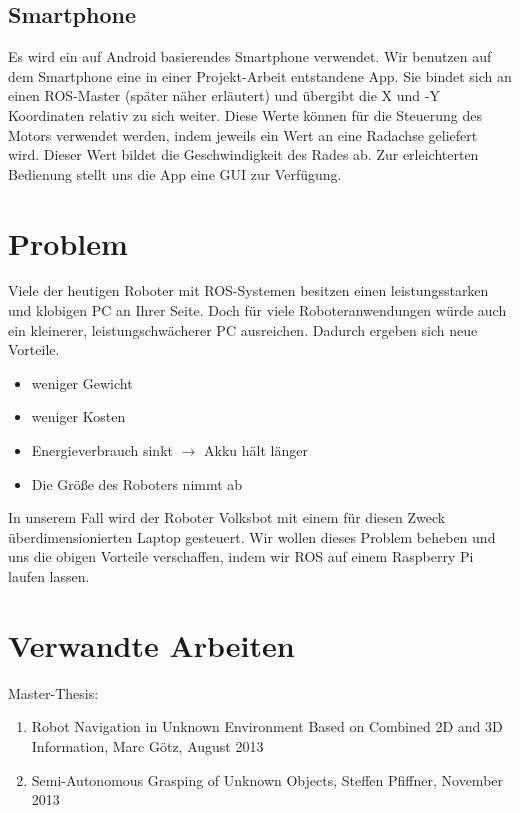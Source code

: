 \documentclass[12pt]{article}
\begin{document}
\subsection{Smartphone}

Es wird ein auf Android basierendes Smartphone verwendet.
Wir benutzen auf dem Smartphone eine in einer Projekt-Arbeit entstandene App.
Sie bindet sich an einen ROS-Master (später näher erläutert) und übergibt die X und -Y Koordinaten relativ zu sich weiter.
Diese Werte können für die Steuerung des Motors verwendet werden, indem jeweils ein Wert an eine Radachse geliefert wird. Dieser Wert bildet die Geschwindigkeit des Rades ab.
Zur erleichterten Bedienung stellt uns die App eine GUI zur Verfügung. 

\section{Problem}

Viele der heutigen Roboter mit ROS-Systemen besitzen einen leistungsstarken und klobigen PC an Ihrer Seite.
Doch für viele Roboteranwendungen würde auch ein kleinerer, leistungschwächerer PC ausreichen.
Dadurch ergeben sich neue Vorteile.

\begin{itemize}
\item weniger Gewicht
\item weniger Kosten
\item Energieverbrauch sinkt $\rightarrow$ Akku hält länger
\item Die Größe des Roboters nimmt ab
\end{itemize}

In unserem Fall wird der Roboter Volksbot mit einem für diesen Zweck überdimensionierten Laptop gesteuert. Wir wollen dieses Problem beheben und uns die obigen Vorteile verschaffen, indem wir ROS auf einem Raspberry Pi laufen lassen.

\section{Verwandte Arbeiten}

Master-Thesis:
\begin{enumerate}

\item Robot Navigation in Unknown Environment Based on Combined 2D and 3D Information, Marc Götz, August 2013
\item Semi-Autonomous Grasping of Unknown Objects, Steffen Pfiffner, November 2013
\end{enumerate}
\end{document}
